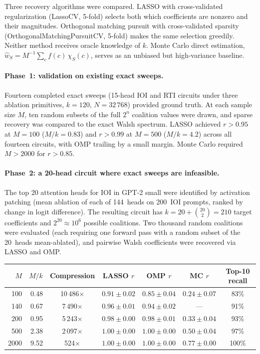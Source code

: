 Three recovery algorithms were compared. LASSO with cross-validated
regularization (LassoCV, 5-fold) selects both which coefficients are nonzero
and their magnitudes. Orthogonal matching pursuit with cross-validated
sparsity (OrthogonalMatchingPursuitCV, 5-fold) makes the same selection
greedily. Neither method receives oracle knowledge of $k$. Monte Carlo
direct estimation, $\hat{w}_S = M^{-1} \sum_c f(c)\, \chi_S(c)$, serves as
an unbiased but high-variance baseline.

\paragraph{Phase~1: validation on existing exact sweeps.}

Fourteen completed exact sweeps (15-head IOI and RTI circuits under three
ablation primitives, $k = 120$, $N = 32\,768$) provided ground truth. At
each sample size $M$, ten random subsets of the full $2^n$ coalition values
were drawn, and sparse recovery was compared to the exact Walsh spectrum.
LASSO achieved $r > 0.95$ at $M = 100$ ($M/k = 0.83$) and $r > 0.99$ at
$M = 500$ ($M/k = 4.2$) across all fourteen circuits, with OMP trailing by
a small margin. Monte Carlo required $M > 2000$ for $r > 0.85$.

\paragraph{Phase~2: a 20-head circuit where exact sweeps are infeasible.}

The top 20 attention heads for IOI in GPT-2 small were identified by
activation patching (mean ablation of each of 144~heads on 200~IOI prompts,
ranked by change in logit difference). The resulting circuit has
$k = 20 + \binom{20}{2} = 210$ target coefficients and $2^{20} \approx 10^6$
possible coalitions. Two thousand random coalitions were evaluated (each
requiring one forward pass with a random subset of the 20~heads mean-ablated),
and pairwise Walsh coefficients were recovered via LASSO and OMP.

\medskip

\begin{tabular}{rrccccc}
\toprule
$M$ & $M/k$ & Compression & LASSO $r$ & OMP $r$ & MC $r$ & Top-10 recall \\
\midrule
  100 & 0.48 &  10\,486$\times$ & $0.91 \pm 0.02$ & $0.85 \pm 0.04$ & $0.24 \pm 0.07$ & 83\% \\
  140 & 0.67 &   7\,490$\times$ & $0.96 \pm 0.01$ & $0.94 \pm 0.02$ & --- & 91\% \\
  200 & 0.95 &   5\,243$\times$ & $0.98 \pm 0.00$ & $0.98 \pm 0.01$ & $0.33 \pm 0.04$ & 93\% \\
  500 & 2.38 &   2\,097$\times$ & $1.00 \pm 0.00$ & $1.00 \pm 0.00$ & $0.50 \pm 0.04$ & 97\% \\
 2000 & 9.52 &     524$\times$ & $1.00 \pm 0.00$ & $1.00 \pm 0.00$ & $0.77 \pm 0.00$ & 100\% \\
\bottomrule
\end{tabular}


